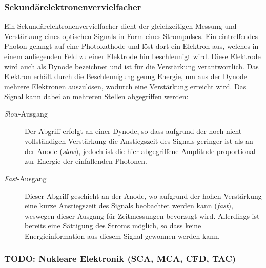 \documentclass[11pt, a4paper]{article}
\numberwithin{equation}{section}
\begin{document}
\subsubsection{Sekundärelektronenvervielfacher}

Ein Sekundärelektronenvervielfacher dient der gleichzeitigen Messung und Verstärkung eines optischen Signals in Form eines Strompulses.
Ein eintreffendes Photon gelangt auf eine Photokathode und löst dort ein Elektron aus, welches in einem anliegenden Feld zu einer Elektrode hin beschleunigt wird.
Diese Elektrode wird auch als Dynode bezeichnet und ist für die Verstärkung verantwortlich.
Das Elektron erhält durch die Beschleunigung genug Energie, um aus der Dynode mehrere Elektronen auszulösen, wodurch eine Verstärkung erreicht wird.
Das Signal kann dabei an mehreren Stellen abgegriffen werden:
\begin{description}
	\item[\textit{Slow}-Ausgang]Der Abgriff erfolgt an einer Dynode, so dass aufgrund der noch nicht vollständigen Verstärkung die Anstiegszeit des Signals geringer ist als an der Anode (\textit{slow}), jedoch ist die hier abgegriffene Amplitude proportional zur Energie der einfallenden Photonen.
	\item[\textit{Fast}-Ausgang]Dieser Abgriff geschieht an der Anode, wo aufgrund der hohen Verstärkung eine kurze Anstiegszeit des Signals beobachtet werden kann (\textit{fast}), weswegen dieser Ausgang für Zeitmessungen bevorzugt wird. Allerdings ist bereits eine Sättigung des Stroms möglich, so dass keine Energieinformation aus diesem Signal gewonnen werden kann.
\end{description}

\subsubsection{TODO: Nukleare Elektronik (SCA, MCA, CFD, TAC)}
\end{document}
